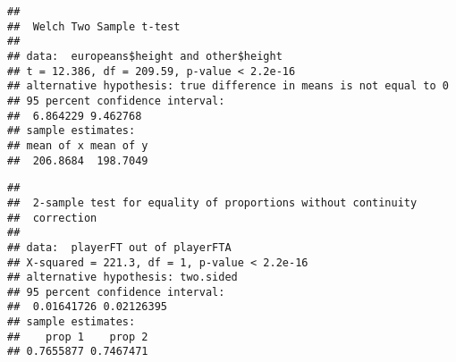 \documentclass[]{article}
\newenvironment{Shaded}{\begin{snugshade}}{\end{snugshade}}
\newcommand{\KeywordTok}[1]{\textcolor[rgb]{0.13,0.29,0.53}{\textbf{#1}}}
\newcommand{\DataTypeTok}[1]{\textcolor[rgb]{0.13,0.29,0.53}{#1}}
\newcommand{\StringTok}[1]{\textcolor[rgb]{0.31,0.60,0.02}{#1}}
\newcommand{\OperatorTok}[1]{\textcolor[rgb]{0.81,0.36,0.00}{\textbf{#1}}}
\newcommand{\NormalTok}[1]{#1}
\begin{document}
\begin{verbatim}
## 
##  Welch Two Sample t-test
## 
## data:  europeans$height and other$height
## t = 12.386, df = 209.59, p-value < 2.2e-16
## alternative hypothesis: true difference in means is not equal to 0
## 95 percent confidence interval:
##  6.864229 9.462768
## sample estimates:
## mean of x mean of y 
##  206.8684  198.7049
\end{verbatim}

\begin{Shaded}
\end{Shaded}

\begin{verbatim}
## 
##  2-sample test for equality of proportions without continuity
##  correction
## 
## data:  playerFT out of playerFTA
## X-squared = 221.3, df = 1, p-value < 2.2e-16
## alternative hypothesis: two.sided
## 95 percent confidence interval:
##  0.01641726 0.02126395
## sample estimates:
##    prop 1    prop 2 
## 0.7655877 0.7467471
\end{verbatim}
\end{document}
